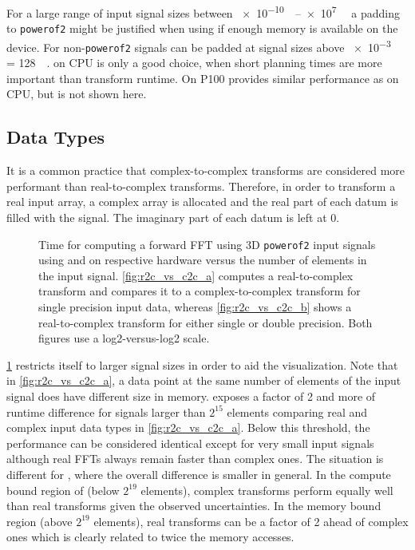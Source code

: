 For a large range of input signal sizes between \SIrange[exponent-base=2]{e-10}{e7}{\mebi\byte} a padding to \texttt{powerof2} might be justified when using \cufft{} if enough memory is available on the device. For \fftw{} non-\texttt{powerof2} signals can be padded at signal sizes above \SI[exponent-base=2]{e-3}{\mebi\byte} = \SI{128}{\kibi\byte}. \clfft{} on CPU is only a good choice, when short planning times are more important than transform runtime. On P100 \clfft{} provides similar performance as on CPU, but is not shown here.

\subsection{Data Types}
\label{ssec:data_types}

It is a common practice that complex-to-complex transforms are considered more performant than real-to-complex transforms. Therefore, in order to transform a real input array, a complex array is allocated and the real part of each datum is filled with the signal. The imaginary part of each datum is left at $0$.

\begin{figure}[!tbp]
  \centering
  \hfill
  \caption{Time for computing a forward FFT using 3D \texttt{powerof2} input signals using \fftw{} and \cufft{} on respective hardware versus the number of elements in the input signal. \cref{fig:r2c_vs_c2c_a} computes a real-to-complex transform and compares it to a complex-to-complex transform for single precision input data, whereas \cref{fig:r2c_vs_c2c_b} shows a real-to-complex transform for either single or double precision. Both figures use a log2-versus-log2 scale.}
  \label{fig:r2c_vs_c2c}
\end{figure}

\cref{fig:r2c_vs_c2c} restricts itself to larger signal sizes in order to aid the visualization. Note that in \cref{fig:r2c_vs_c2c_a}, a data point at the same number of elements of the input signal does have different size in memory. \fftw{} exposes a factor of 2 and more of runtime difference for signals larger than $2^{15}$ elements comparing real and complex input data types in \cref{fig:r2c_vs_c2c_a}. Below this threshold, the performance can be considered identical except for very small input signals although real FFTs always remain faster than complex ones. The situation is different for \cufft{}, where the overall difference is smaller in general. In the compute bound region of \cufft{} (below $2^{19}$ elements), complex transforms perform equally well than real transforms given the observed uncertainties. In the memory bound region (above $2^{19}$ elements), real transforms can be a factor of 2 ahead of complex ones which is clearly related to twice the memory accesses.    

